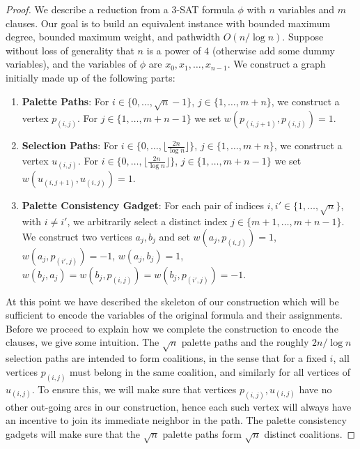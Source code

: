 \documentclass[letterpaper,USenglish,cleveref, autoref, thm-restate]{lipics-v2021}
\begin{document}
\begin{proof}

We describe a reduction from a \textsc{3-SAT} formula $\phi$ with $n$ variables
and $m$ clauses. Our goal is to build an equivalent instance with bounded
maximum degree, bounded  maximum weight, and pathwidth $O(n/\log n)$. Suppose
without loss of generality that $n$ is a power of $4$ (otherwise add some dummy
variables), and the variables of $\phi$ are $x_0,x_1,\ldots, x_{n-1}$. We
construct a graph initially made up of the following parts:

\begin{enumerate}

\item \textbf{Palette Paths}: For $i\in\{0,\ldots,\sqrt{n}-1\}$,
$j\in\{1,\ldots,m+n\}$, we construct a vertex $p_{(i,j)}$. For
$j\in\{1,\ldots,m+n-1\}$ we set $w(p_{(i,j+1)}, p_{(i,j)}) = 1$.

\item \textbf{Selection Paths}: For $i\in \{0,\ldots, \lfloor\frac{2n}{\log
n}\rfloor\}$, $j\in \{1,\ldots,m+n\}$, we construct a vertex $u_{(i,j)}$.  For
$i\in \{0,\ldots, \lfloor\frac{2n}{\log n}\rfloor\}$, $j\in \{1,\ldots,m+n-1\}$
we set $w(u_{(i,j+1)}, u_{(i,j)})=1$.

\item \textbf{Palette Consistency Gadget}: For each pair of indices $i,i' \in
\{1,\ldots,\sqrt{n}\}$, with $i\neq i'$, we arbitrarily select a distinct index
$j\in \{m+1,\ldots,m+n-1\}$. We construct two vertices $a_j, b_j$ and set
$w(a_j, p_{(i,j)}) = 1$, $w(a_j, p_{(i',j)}) = -1$, $w(a_j,b_j)=1$,
$w(b_j,a_j)=w(b_j,p_{(i,j)})=w(b_j,p_{(i',j)})=-1$.

\end{enumerate}

At this point we have described the skeleton of our construction which will be
sufficient to encode the variables of the original formula and their
assignments.  Before we proceed to explain how we complete the construction to
encode the clauses, we give some intuition. The $\sqrt{n}$ palette paths and
the roughly $2n/\log n$ selection paths are intended to form coalitions, in the
sense that for a fixed $i$, all vertices $p_{(i,j)}$ must belong in the same
coalition, and similarly for all vertices of $u_{(i,j)}$. To ensure this, we
will make sure that vertices $p_{(i,j)}, u_{(i,j)}$ have no other out-going
arcs in our construction, hence each such vertex will always have an incentive
to join its immediate neighbor in the path. The palette consistency gadgets
will make sure that the $\sqrt{n}$ palette paths form $\sqrt{n}$ distinct
coalitions.


\end{proof}
\end{document}
